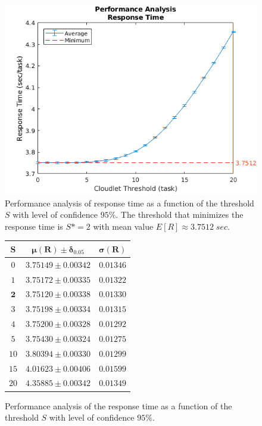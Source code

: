 \begin{figure}
	\includegraphics[width=\columnwidth]{fig/evaluation-performance-analysis-response-time}
	\caption{Performance analysis of response time as a function of the threshold $S$ with level of confidence $95\%$. The threshold that minimizes the response time is $S*=2$ with mean value $E[R]\approx3.7512 \; sec$.}
	\label{fig:evaluation-performance-analysis-response-time}
\end{figure}

\begin{figure}
	\begin{center}
	\begin{tabular}{|c||c|c|}
		\hline
		$\mathbf{S}$ & $\mathbf{\mu(R)\pm\delta_{0.05}}$ & $\mathbf{\sigma(R)}$\\
		\hline
		$0$  & $3.75149\pm 0.00342$ & $0.01346$ \\
		$1$  & $3.75172\pm 0.00335$ & $0.01322$ \\
		$\mathbf{2}$  & $\mathbf{3.75120\pm 0.00338}$ & $\mathbf{0.01330}$ \\
		$3$  & $3.75198\pm 0.00334$ & $0.01315$ \\
		$4$  & $3.75200\pm 0.00328$ & $0.01292$ \\
		$5$  & $3.75430\pm 0.00324$ & $0.01275$ \\
		$10$ & $3.80394\pm 0.00330$ & $0.01299$ \\
		$15$ & $4.01623\pm 0.00406$ & $0.01599$ \\
		$20$ & $4.35885\pm 0.00342$ & $0.01349$ \\
		\hline
	\end{tabular}
	\end{center}
	\caption{Performance analysis of the response time as a function of the threshold $S$ with level of confidence $95\%$.}
	\label{tbl:evaluation-performance-analysis-response-time}
\end{figure}

